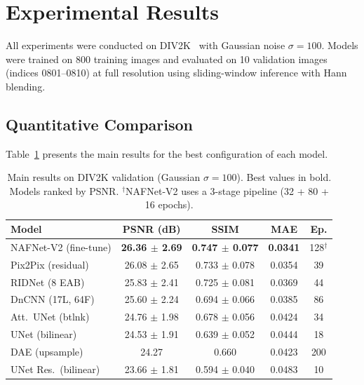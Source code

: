 \section{Experimental Results}
\label{sec:results}

All experiments were conducted on DIV2K~\cite{div2k} with Gaussian noise $\sigma = 100$. Models were trained on 800 training images and evaluated on 10 validation images (indices 0801--0810) at full resolution using sliding-window inference with Hann blending.

\subsection{Quantitative Comparison}

Table~\ref{tab:main_results} presents the main results for the best configuration of each model.

\begin{table}[t]
\centering
\small
\setlength{\tabcolsep}{2pt}
\begin{tabular}{lcccc}
\toprule
\textbf{Model} & \textbf{PSNR (dB)} & \textbf{SSIM} & \textbf{MAE} & \textbf{Ep.} \\
\midrule
NAFNet-V2 (fine-tune) & \textbf{26.36 $\pm$ 2.69} & \textbf{0.747 $\pm$ 0.077} & \textbf{0.0341} & 128$^\dagger$ \\
Pix2Pix (residual) & 26.08 $\pm$ 2.65 & 0.733 $\pm$ 0.078 & 0.0354 & 39 \\
RIDNet (8 EAB) & 25.83 $\pm$ 2.41 & 0.725 $\pm$ 0.081 & 0.0369 & 44 \\
DnCNN (17L, 64F) & 25.60 $\pm$ 2.24 & 0.694 $\pm$ 0.066 & 0.0385 & 86 \\
Att.\ UNet (btlnk) & 24.76 $\pm$ 1.98 & 0.678 $\pm$ 0.056 & 0.0424 & 34 \\
UNet (bilinear) & 24.53 $\pm$ 1.91 & 0.639 $\pm$ 0.052 & 0.0444 & 18 \\
DAE (upsample) & 24.27 & 0.660 & 0.0423 & 200 \\
UNet Res.\ (bilinear) & 23.66 $\pm$ 1.81 & 0.594 $\pm$ 0.040 & 0.0483 & 10 \\
\bottomrule
\end{tabular}
\caption{Main results on DIV2K validation (Gaussian $\sigma = 100$). Best values in bold. Models ranked by PSNR. $^\dagger$NAFNet-V2 uses a 3-stage pipeline (32 + 80 + 16 epochs).}
\label{tab:main_results}
\end{table}

